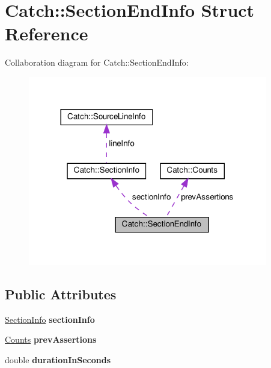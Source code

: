 \hypertarget{structCatch_1_1SectionEndInfo}{}\section{Catch\+::Section\+End\+Info Struct Reference}
\label{structCatch_1_1SectionEndInfo}


Collaboration diagram for Catch\+::Section\+End\+Info\+:\nopagebreak
\begin{figure}[H]
\begin{center}
\leavevmode
\includegraphics[width=296pt]{structCatch_1_1SectionEndInfo__coll__graph}
\end{center}
\end{figure}
\subsection*{Public Attributes}
\begin{DoxyCompactItemize}
\item 
\mbox{\label{structCatch_1_1SectionEndInfo_a2d44793392cb83735d086d726822abe9}} 
\mbox{\hyperlink{structCatch_1_1SectionInfo}{Section\+Info}} {\bfseries section\+Info}
\item 
\mbox{\label{structCatch_1_1SectionEndInfo_ae70b154cbc05b5dd2901d97f89303d8c}} 
\mbox{\hyperlink{structCatch_1_1Counts}{Counts}} {\bfseries prev\+Assertions}
\item 
\mbox{\label{structCatch_1_1SectionEndInfo_a7c262f2dab9cff166b8eca620c47eea5}} 
double {\bfseries duration\+In\+Seconds}
\end{DoxyCompactItemize}


